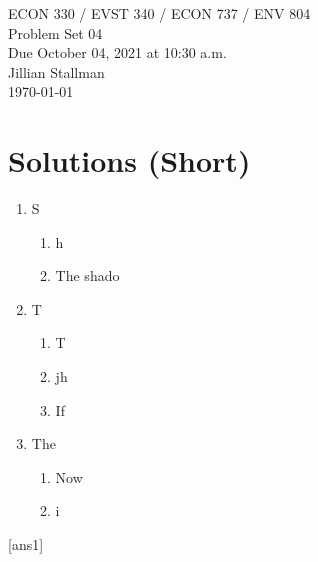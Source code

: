 \noindent
\Large ECON 330 / EVST 340 / ECON 737 / ENV 804 \\
 	\large Problem Set 04 \\
 	\large Due October 04, 2021 at 10:30 a.m.\\
 	\large Jillian Stallman\\
 	\today \\[1.5em] %
 	
 	
 \section*{Solutions (Short)}
\begin{enumerate}
    \item S
    \begin{enumerate}
        \item h
        \item The shado
    \end{enumerate}
    
    \item T
    \begin{enumerate}
        \item T
        \item jh
        \item If 
    \end{enumerate}
    \item The
    \begin{enumerate}
        \item Now 
        \item i
    \end{enumerate}
\end{enumerate}


[ans1]


